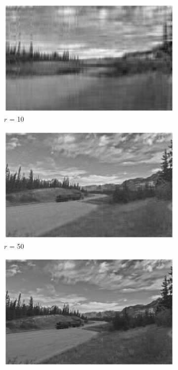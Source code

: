 \begin{figure}[h]
  \centering
  \begin{subfigure}{0.32\textwidth}
      \includegraphics[width=\textwidth]{external_content/media/compression_example/n=10.png}
      \caption{$r$ = 10}
      \label{fig:compressionNX}
  \end{subfigure}
  \hfill
  \begin{subfigure}{0.32\textwidth}
      \includegraphics[width=\textwidth]{external_content/media/compression_example/n=50.png}
      \caption{$r$ = 50}
      \label{fig:compressionNL}
  \end{subfigure}
  \hfill
  \begin{subfigure}{0.32\textwidth}
      \includegraphics[width=\textwidth]{external_content/media/compression_example/n=120.png}

\end{subfigure}
\end{figure}
